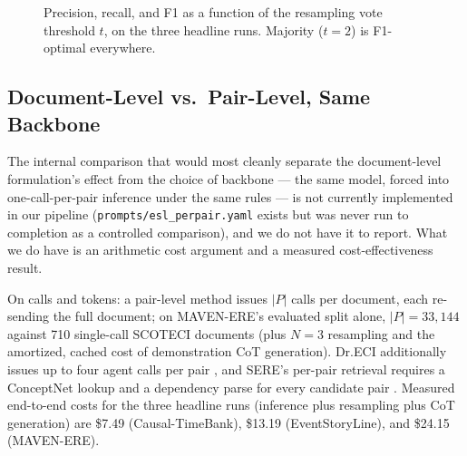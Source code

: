 \documentclass[11pt]{article}
\newcommand{\method}{SCOTECI}
\begin{document}
\begin{figure}[t]
  \centering
  \caption{Precision, recall, and F1 as a function of the resampling vote
  threshold $t$, on the three headline runs. Majority ($t{=}2$) is F1-optimal
  everywhere.}
  \label{fig:vote}
\end{figure}

\subsection{Document-Level vs.\ Pair-Level, Same Backbone}
\label{sec:cost}

The internal comparison that would most cleanly separate the document-level
formulation's effect from the choice of backbone --- the same model, forced into
one-call-per-pair inference under the same rules --- is not currently implemented
in our pipeline (\texttt{prompts/esl\_perpair.yaml} exists but was never run to
completion as a controlled comparison), and we do not have it to report. What we
do have is an arithmetic cost argument and a measured cost-effectiveness result.

On calls and tokens: a pair-level method issues $|P|$ calls per document, each
re-sending the full document; on MAVEN-ERE's evaluated split alone, $|P|=33{,}144$
against 710 single-call \method{} documents (plus $N=3$ resampling and the
amortized, cached cost of demonstration CoT generation). Dr.ECI additionally
issues up to four agent calls per pair \citep{cai2025dreci}, and SERE's per-pair
retrieval requires a ConceptNet lookup and a dependency parse for every candidate
pair \citep{hao2026sere}. Measured end-to-end costs for the three headline runs
(inference plus resampling plus CoT generation) are \$7.49 (Causal-TimeBank),
\$13.19 (EventStoryLine), and \$24.15 (MAVEN-ERE).
\end{document}

